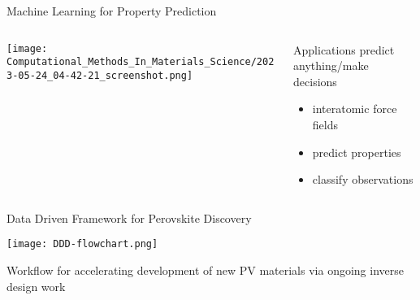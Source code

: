 \documentclass[10pt, aspectratio=169, presentation]{beamer}
\begin{document}
\begin{frame}[label={sec:orgf033f5e}]{Machine Learning for Property Prediction}
\begin{columns}
\begin{column}{0.7\columnwidth}
\begin{center}
\texttt{[image: Computational\_Methods\_In\_Materials\_Science/2023-05-24\_04-42-21\_screenshot.png]}
\end{center}
\end{column}


\begin{column}{0.3\columnwidth}
\begin{block}{Applications}
predict anything/make decisions\autocite{pablo-2019-new-front}
\begin{itemize}
\item interatomic force fields
\item predict properties
\item classify observations
\end{itemize}
\end{block}
\end{column}
\end{columns}
\end{frame}

\begin{frame}[label={sec:org5b45468}]{Data Driven Framework for Perovskite Discovery}
\begin{center}
\texttt{[image: DDD-flowchart.png]}
\end{center}
\center{}\vspace{-0.75cm}Workflow for accelerating development of new PV materials
\autocite{yang-2023-high-throug}
via ongoing inverse design work
\autocite{yang-2023-discov-novel}
\end{frame}
\end{document}
